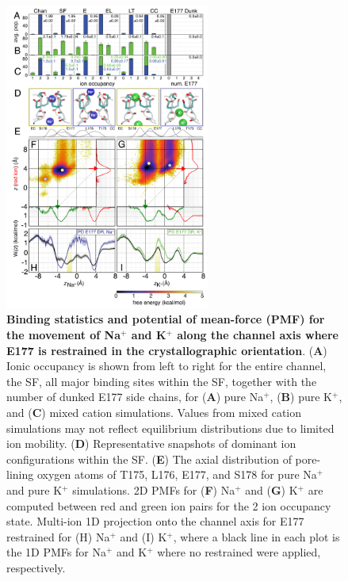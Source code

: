 \begin{refsection}
\begin{figure}[!htb]
\centering
\includegraphics[width=0.6\textwidth]{nav2/Nav2Fig5}
\caption[Binding statistics and potential of mean-force (PMF) for the movement of Na$^+$ and K$^+$ along the channel axis where E177 is restrained in the crystallographic orientation]{\textbf{Binding statistics and potential of mean-force (PMF) for the movement of Na$^+$ and K$^+$ along the channel axis where E177 is restrained in the crystallographic orientation}. (\textbf{A}) Ionic occupancy is shown from left to right for the entire channel, the SF, all major binding sites within the SF, together with the number of dunked E177 side chains, for (\textbf{A}) pure Na$^+$, (\textbf{B}) pure K$^+$, and (\textbf{C}) mixed cation simulations. Values from mixed cation simulations may not reflect equilibrium distributions due to limited ion mobility. (\textbf{D}) Representative snapshots of dominant ion configurations within the SF. (\textbf{E}) The axial distribution of pore-lining oxygen atoms of T175, L176, E177, and S178 for pure Na$^+$ and pure K$^+$ simulations. 2D PMFs for (\textbf{F}) Na$^+$ and (\textbf{G}) K$^+$ are computed between red and green ion pairs for the 2 ion occupancy state. Multi-ion 1D projection onto the channel axis for E177 restrained for (H) Na$^+$ and (I) K$^+$, where a black line in each plot is the 1D PMFs for Na$^+$ and K$^+$ where no restrained were applied, respectively.}
\label{fig:nav2fig5}
\end{figure}


\end{refsection}
